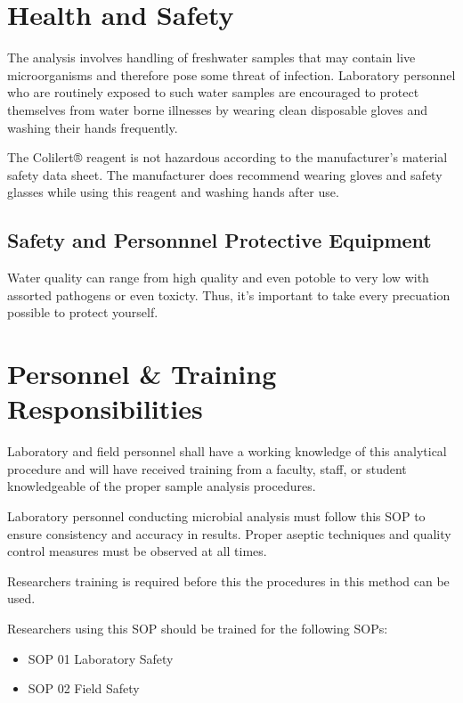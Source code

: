 \documentclass[12pt]{../SOP4_alpha}\usepackage[]{graphicx}\usepackage[]{xcolor}
\begin{document}
\section{Health and Safety}

\NP The analysis involves handling of freshwater samples that may contain live
microorganisms and therefore pose some threat of infection. Laboratory personnel
who are routinely exposed to such water samples are encouraged to protect
themselves from water borne illnesses by wearing clean disposable gloves and
washing their hands frequently.

\NP The Colilert® reagent is not hazardous according to the manufacturer's material
safety data sheet. The manufacturer does recommend wearing gloves and safety
glasses while using this reagent and washing hands after use. 


\subsection{Safety and Personnnel Protective Equipment}

Water quality can range from high quality and even potoble to very low with assorted pathogens or even toxicty. Thus, it's important to take every precuation possible to protect yourself. 

\section{Personnel \& Training Responsibilities}

\NP Laboratory and field personnel shall have a working knowledge of this analytical procedure and will have received training from a faculty, staff, or student knowledgeable of the proper sample analysis procedures. 

\NP Laboratory personnel conducting microbial analysis must follow this SOP to ensure consistency and accuracy in results. Proper aseptic techniques and quality control measures must be observed at all times.

\NP Researchers training is required before this the procedures in this method can be used.

\NP Researchers using this SOP should be trained for the following SOPs:

\begin{itemize}
  \item SOP 01 Laboratory Safety
  \item SOP 02 Field Safety
\end{itemize}
\end{document}
